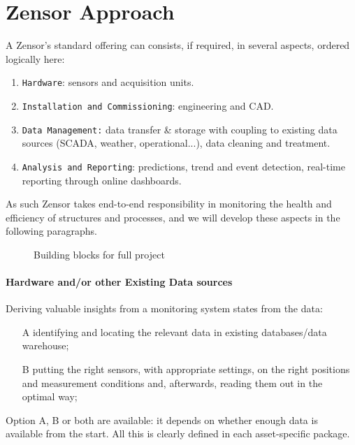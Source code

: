 \section{Zensor Approach}\label{section:zensor_approach}
A Zensor's standard offering can consists, if required, in several aspects, ordered logically here:
\begin{enumerate}
	\item \texttt{Hardware}: sensors and acquisition units.
	\item \texttt{Installation and Commissioning}: engineering and CAD.
	\item \texttt{Data Management:} data transfer \& storage with coupling to existing data sources (SCADA, weather, operational...), data cleaning and treatment.
	\item \texttt{Analysis and Reporting}: predictions, trend and event detection, real-time reporting through online dashboards.
\end{enumerate}
As such Zensor takes end-to-end responsibility in monitoring the health and efficiency of structures and processes, and
we will develop these aspects in the following paragraphs.
\begin{figure}[ht]
	\centering
	\caption{Building blocks for full project}
	\label{tik:standar_offer}
\end{figure}

\paragraph{Hardware and/or other Existing Data sources}
Deriving valuable insights from a monitoring system states from the data:
\begin{itemize}
	\item[A] identifying and locating the relevant data in existing databases/data warehouse;
	\item[B] putting the right sensors, with appropriate settings, on the right positions and measurement conditions and, afterwards, reading them out in the optimal way;
\end{itemize}
Option A, B or both are available: it depends on whether enough data is available from the start.
All this is clearly defined in each asset-specific package.

